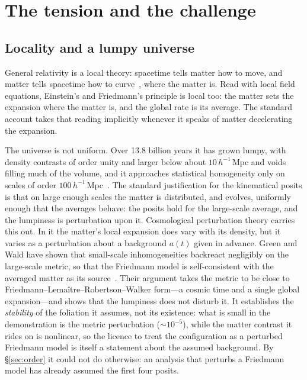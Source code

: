 \documentclass[11pt,a4paper]{article}
\begin{document}
\section{The tension and the challenge}\label{sec:challenge}

\subsection{Locality and a lumpy universe}\label{sec:tension}

General relativity is a local theory: spacetime tells matter how to move, and matter tells spacetime how to curve~\cite{Wheeler1998}, where the matter is. Read with local field equations, Einstein's and Friedmann's principle is local too: the matter sets the expansion where the matter is, and the global rate is its average. The standard account takes that reading implicitly whenever it speaks of matter decelerating the expansion.

The universe is not uniform. Over 13.8 billion years it has grown lumpy, with density contrasts of order unity and larger below about $10\,h^{-1}$\,Mpc and voids filling much of the volume, and it approaches statistical homogeneity only on scales of order $100\,h^{-1}$\,Mpc~\cite{Scrimgeour2012}. The standard justification for the kinematical posits is that on large enough scales the matter is distributed, and evolves, uniformly enough that the averages behave: the posits hold for the large-scale average, and the lumpiness is perturbation upon it. Cosmological perturbation theory carries this out. In it the matter's local expansion does vary with its density, but it varies as a perturbation about a background $a(t)$ given in advance. Green and Wald have shown that small-scale inhomogeneities backreact negligibly on the large-scale metric, so that the Friedmann model is self-consistent with the averaged matter as its source~\cite{GreenWald2011, GreenWald2014}. Their argument takes the metric to be close to Friedmann--Lema\^itre--Robertson--Walker form---a cosmic time and a single global expansion---and shows that the lumpiness does not disturb it. It establishes the \emph{stability} of the foliation it assumes, not its existence: what is small in the demonstration is the metric perturbation ($\sim\!10^{-5}$), while the matter contrast it rides on is nonlinear, so the licence to treat the configuration as a perturbed Friedmann model is itself a statement about the assumed background. By \S\ref{sec:order} it could not do otherwise: an analysis that perturbs a Friedmann model has already assumed the first four posits.
\end{document}
